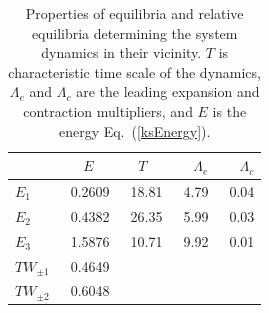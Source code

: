 \documentclass[aip,cha,showpacs,reprint]{revtex4-1} %
\newcommand{\refeq}  [1] {Eq.~(\ref{#1})}                   %
\newcommand{\ExpaEig}{\ensuremath{\Lambda}}
\newcommand{\EQV}[1]{\ensuremath{E_{#1}}}
\newcommand{\REQV}[2]{\ensuremath{TW_{#1#2}}} %
\begin{document}
\begin{table}[ht]
    \caption{
    Properties of equilibria and relative equilibria determining
    the system dynamics in their vicinity.  $T$ is characteristic
    time scale of the dynamics, $\ExpaEig_e$ and $\ExpaEig_c$ are the
    leading expansion and contraction multipliers, and $E$ is the
    energy \refeq{ksEnergy}.
            }
\begin{center} \footnotesize
    \begin{tabular}{l|rrrr}
                 & $E$~~   & $T$~~  & $\ExpaEig_e$  & $\ExpaEig_c$  \\ \hline
 $\EQV{1}\ $     &\ 0.2609 &\ 18.81 &\ 4.79     &\ 0.04 \\
 $\EQV{2}\ $     &\ 0.4382 &\ 26.35 &\ 5.99     &\ 0.03 \\
 $\EQV{3}\ $     &\ 1.5876 &\ 10.71 &\ 9.92     &\ 0.01 \\
 $\REQV{\pm}{1}$ &\ 0.4649 &  &  & \\
 $\REQV{\pm}{2}$ &\ 0.6048 &  &  & \\
    \end{tabular}
\end{center}
\label{tab:L22cminus}
\end{table}
\end{document}
